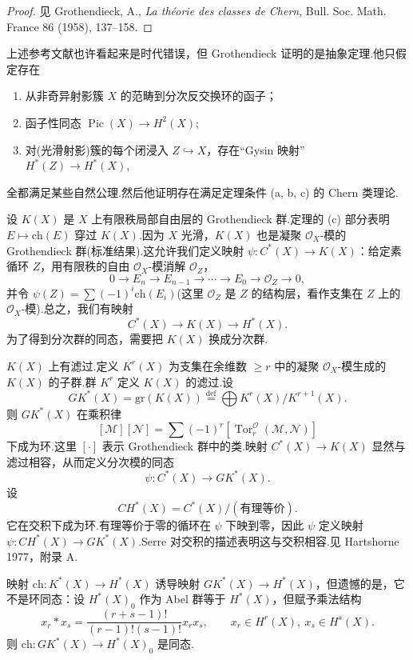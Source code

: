 \begin{proof}
见 Grothendieck, A., \emph{La th\'eorie des classes de Chern}, Bull. Soc. Math. France 86 (1958), 137--158.
\end{proof}

上述参考文献也许看起来是时代错误，但 Grothendieck 证明的是抽象定理.他只假定存在
\begin{enumerate}
  \item[(i)] 从非奇异射影簇 $X$ 的范畴到分次反交换环的函子；
  \item[(ii)] 函子性同态 $\operatorname{Pic}(X) \to H^{2}(X)$;
  \item[(iii)] 对(光滑射影)簇的每个闭浸入 $Z \hookrightarrow X$，存在``Gysin 映射'' $H^{*}(Z) \to H^{*}(X)$,
\end{enumerate}
全都满足某些自然公理.然后他证明存在满足定理条件 (a, b, c) 的 Chern 类理论.

设 $K(X)$ 是 $X$ 上有限秩局部自由层的 Grothendieck 群.定理的 (c) 部分表明 $E \mapsto \mathrm{ch}(E)$ 穿过 $K(X)$.因为 $X$ 光滑，$K(X)$ 也是凝聚 $\mathcal{O}_X$-模的 Grothendieck 群(标准结果).这允许我们定义映射 $\psi \colon C^{*}(X) \to K(X)$：给定素循环 $Z$，用有限秩的自由 $\mathcal{O}_X$-模消解 $\mathcal{O}_Z$，
\[
0 \to E_n \to E_{n-1} \to \cdots \to E_0 \to \mathcal{O}_Z \to 0,
\]
并令 $\psi(Z) = \sum (-1)^{i}\mathrm{ch}(E_i)$(这里 $\mathcal{O}_Z$ 是 $Z$ 的结构层，看作支集在 $Z$ 上的 $\mathcal{O}_X$-模).总之，我们有映射
\[
C^{*}(X) \to K(X) \to H^{*}(X).
\]
为了得到分次群的同态，需要把 $K(X)$ 换成分次群.

$K(X)$ 上有滤过.定义 $K^{r}(X)$ 为支集在余维数 $\geq r$ 中的凝聚 $\mathcal{O}_X$-模生成的 $K(X)$ 的子群.群 $K^{r}$ 定义 $K(X)$ 的滤过.设
\[
GK^{*}(X) = \mathrm{gr}(K(X)) \overset{\mathrm{def}}{=} \bigoplus K^{r}(X)/K^{r+1}(X).
\]
则 $GK^{*}(X)$ 在乘积律
\[
[\mathcal{M}][\mathcal{N}] = \sum (-1)^{r}[\operatorname{Tor}^{\mathcal{O}}_r(\mathcal{M}, \mathcal{N})]
\]
下成为环.这里 $[\cdot]$ 表示 Grothendieck 群中的类.映射 $C^{*}(X) \to K(X)$ 显然与滤过相容，从而定义分次模的同态
\[
\psi \colon C^{*}(X) \to GK^{*}(X).
\]
设
\[
CH^{*}(X) = C^{*}(X)/(\text{有理等价}).
\]
它在交积下成为环.有理等价于零的循环在 $\psi$ 下映到零，因此 $\psi$ 定义映射 $\psi \colon CH^{*}(X) \to GK^{*}(X)$.Serre 对交积的描述表明这与交积相容.见 Hartshorne 1977，附录 A.

映射 $\mathrm{ch} \colon K^{*}(X) \to H^{*}(X)$ 诱导映射 $GK^{*}(X) \to H^{*}(X)$，但遗憾的是，它不是环同态：设 $H^{*}(X)_0$ 作为 Abel 群等于 $H^{*}(X)$，但赋予乘法结构
\[
x_r * x_s = \frac{(r+s-1)!}{(r-1)!(s-1)!} x_r x_s, \qquad x_r \in H^{r}(X), \ x_s \in H^{s}(X).
\]
则 $\mathrm{ch} \colon GK^{*}(X) \to H^{*}(X)_0$ 是同态.

